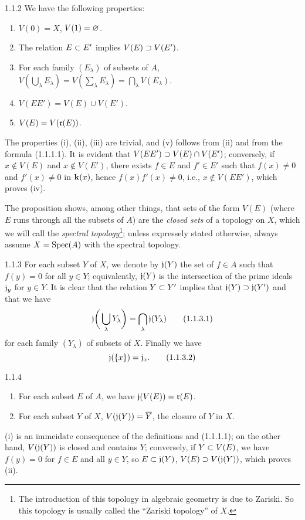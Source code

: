 \documentclass[../main.tex]{subfiles}
\begin{document}
\begin{env}[Proposition]{1.1.2}
We have the following properties:
\begin{enumerate}[label=(\roman*)]
  \item $V(0)=X$, $V(1)=\varnothing$.
  \item The relation $E\subset E'$ implies $V(E)\supset V(E')$.
  \item For each family $(E_\lambda)$ of subsets of $A$,
  $V(\bigcup_\lambda E_\lambda)=V(\sum_\lambda E_\lambda)=\bigcap_\lambda V(E_\lambda)$.
  \item $V(EE')=V(E)\cup V(E')$.
  \item $V(E)=V(\mathfrak{r}(E))$.
\end{enumerate}
\end{env}
The properties (i), (ii), (iii) are trivial, and (v) follows from (ii) and from the
formula (1.1.1.1). It is evident that $V(EE')\supset V(E)\cap V(E')$; conversely, if
$x\not\in V(E)$ and $x\not\in V(E')$, there exists $f\in E$ and $f'\in E'$ such that
$f(x)\neq 0$ and $f'(x)\neq 0$ in $\mathbf{k}(x)$, hence $f(x)f'(x)\neq 0$, i.e., $x\not\in V(EE')$,
which proves (iv).

The proposition  shows, among other things, that sets of the form $V(E)$ (where
$E$ runs through all the subsets of $A$) are the \emph{closed sets} of a topology on
$X$, which we will call the \emph{spectral topology}\footnote{The introduction of this
topology in algebraic geometry is due to Zariski. So this topology is usually called
the ``Zariski topology'' of $X$.}; unless expressely stated otherwise, always assume
$X=\operatorname{Spec}(A)$ with the spectral topology.

\begin{env}{1.1.3}
For each subset $Y$ of $X$, we denote by $\mathfrak{j}(Y)$ the set of $f\in A$
such that $f(y)=0$ for all $y\in Y$; equivalently, $\mathfrak{j}(Y)$ is the intersection of
the prime ideals $\mathfrak{j}_y$ for $y\in Y$. It is clear that the relation $Y\subset Y'$
implies that $\mathfrak{j}(Y)\supset\mathfrak{j}(Y')$ and that we have
\begin{equation}
  \mathfrak{j}\bigg(\bigcup_\lambda Y_\lambda\bigg)=\bigcap_\lambda\mathfrak{j}(Y_\lambda)\tag{1.1.3.1}
\end{equation}
for each family $(Y_\lambda)$ of subsets of $X$. Finally we have
\begin{equation}
  \mathfrak{j}(\{x\})=\mathfrak{j}_x.\tag{1.1.3.2}
\end{equation}
\end{env}

\begin{env}[Proposition]{1.1.4}
\begin{enumerate}[label=(\roman*)]
  \item For each subset $E$ of $A$, we have $\mathfrak{j}(V(E))=\mathfrak{r}(E)$.
  \item For each subset $Y$ of $X$, $V(\mathfrak{j}(Y))=\overline{Y}$, the closure of $Y$ in $X$.
\end{enumerate}
\end{env}
(i) is an immeidate consequence of the definitions and (1.1.1.1); on the other hand, $V(\mathfrak{j}(Y))$
is closed and contains $Y$; conversely, if $Y\subset V(E)$, we have $f(y)=0$ for $f\in E$ and all $y\in Y$,
so $E\subset\mathfrak{j}(Y)$, $V(E)\supset V(\mathfrak{j}(Y))$, which proves (ii).
\end{document}
